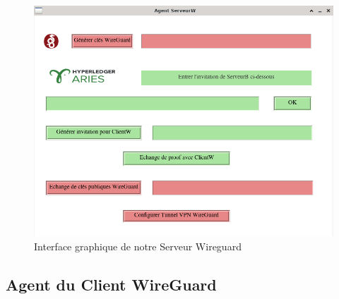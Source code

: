 \documentclass[12pt, openany]{report}
\begin{document}
\begin{flushleft}
\begin{figure}[H]
\includegraphics[scale=0.5]{serveurW.png}
\centering
\caption{Interface graphique de notre Serveur Wireguard}
\end{figure}

\end{flushleft}

\subsection{Agent du Client WireGuard}
\end{document}
